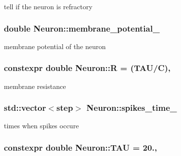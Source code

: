 tell if the neuron is refractory 

\hypertarget{classNeuron_a58829bf280bb52776e8842c71a92af4a}{
\subsubsection[{membrane\-\_\-potential\-\_\-}]{\setlength{\rightskip}{0pt plus 5cm}double Neuron\-::membrane\-\_\-potential\-\_\-\hspace{0.3cm}{\ttfamily [private]}}}\label{classNeuron_a58829bf280bb52776e8842c71a92af4a}


membrane potential of the neuron 

\hypertarget{classNeuron_ac17d81bf956c9baee8e73fa3b45ec30f}{
\subsubsection[{R}]{\setlength{\rightskip}{0pt plus 5cm}constexpr double Neuron\-::\-R = ({\bf T\-A\-U}/{\bf C})\hspace{0.3cm}{\ttfamily [static]}, {\ttfamily [private]}}}\label{classNeuron_ac17d81bf956c9baee8e73fa3b45ec30f}


membrane resistance 

\hypertarget{classNeuron_aff71dff6bedb3ca0a516e42c69046853}{
\subsubsection[{spikes\-\_\-time\-\_\-}]{\setlength{\rightskip}{0pt plus 5cm}std\-::vector$<${\bf step}$>$ Neuron\-::spikes\-\_\-time\-\_\-\hspace{0.3cm}{\ttfamily [private]}}}\label{classNeuron_aff71dff6bedb3ca0a516e42c69046853}


times when spikes occure 

\hypertarget{classNeuron_a89127210a603e20aba05463c85df38e8}{
\subsubsection[{T\-A\-U}]{\setlength{\rightskip}{0pt plus 5cm}constexpr double Neuron\-::\-T\-A\-U = 20.\hspace{0.3cm}{\ttfamily [static]}, {\ttfamily [private]}}}\label{classNeuron_a89127210a603e20aba05463c85df38e8}


